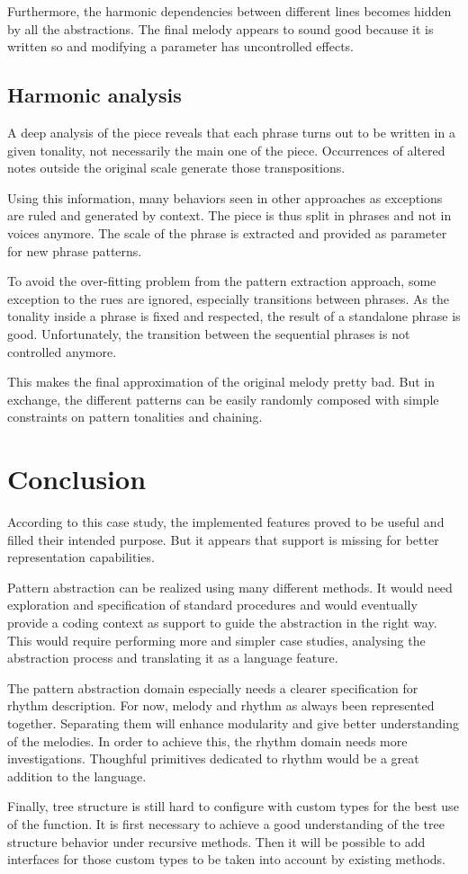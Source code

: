 \documentclass[twocolumn, 11pt]{article}
\begin{document}
Furthermore, the harmonic dependencies between different lines becomes hidden by all the abstractions. The final melody appears to sound good because it is written so and modifying a parameter has uncontrolled effects.

\subsection{Harmonic analysis}

A deep analysis of the piece reveals that each phrase turns out to be written in a given tonality, not necessarily the main one of the piece.
Occurrences of altered notes outside the original scale generate those transpositions.

Using this information, many behaviors seen in other approaches as exceptions are ruled and generated by context.
The piece is thus split in phrases and not in voices anymore. The scale of the phrase is extracted and provided as parameter for new phrase patterns.

To avoid the over-fitting problem from the pattern extraction approach, some exception to the rues are ignored, especially transitions between phrases. As the tonality inside a phrase is fixed and respected, the result of a standalone phrase is good. Unfortunately, the transition between the sequential phrases is not controlled anymore.


This makes the final approximation of the original melody pretty bad. But in exchange, the different patterns can be easily randomly composed with simple constraints on pattern tonalities and chaining.


\section{Conclusion}

According to this case study, the implemented features proved to be useful and filled their intended purpose.
But it appears that support is missing for better representation capabilities.

Pattern abstraction can be realized using many different methods. It would need exploration and specification of standard procedures and would eventually provide a coding context as support to guide the abstraction in the right way.
This would require performing more and simpler case studies, analysing the abstraction process and translating it as a language feature.

The pattern abstraction domain especially needs a clearer specification for rhythm description. For now, melody and rhythm as always been represented together. Separating them will enhance modularity and give better understanding of the melodies.
In order to achieve this, the rhythm domain needs more investigations. Thoughful primitives dedicated to rhythm would be a great addition to the language.

Finally, tree structure is still hard to configure with custom types for the best use of the  function. It is first necessary to achieve a good understanding of the tree structure behavior under recursive methods. Then it will be possible to add interfaces for those custom types to be taken into account by existing methods.
\end{document}
